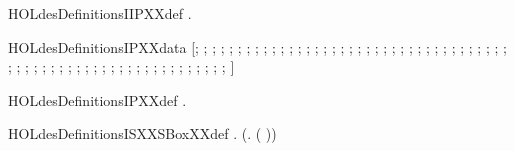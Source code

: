 \newcommand{\HOLdesDefinitionsIIPXXdata}{\UseVerbatim{HOLdesDefinitionsIIPXXdata}}
\begin{SaveVerbatim}{HOLdesDefinitionsIIPXXdef}
\HOLTokenTurnstile{} \HOLSymConst{\HOLTokenForall{}}.   \HOLSymConst{=}   
\end{SaveVerbatim}
\newcommand{\HOLdesDefinitionsIIPXXdef}{\UseVerbatim{HOLdesDefinitionsIIPXXdef}}
\begin{SaveVerbatim}{HOLdesDefinitionsIPXXdata}
\HOLTokenTurnstile{}  \HOLSymConst{=}
   [; ; ; ; ; ; ; ; ; ; ; ; ; ; ;
    ; ; ; ; ; ; ; ; ; ; ; ; ; ; ;
    ; ; ; ; ; ; ; ; ; ; ; ; ; ; ; ;
    ; ; ; ; ; ; ; ; ; ; ; ; ; ; ;
    ; ; ]
\end{SaveVerbatim}
\newcommand{\HOLdesDefinitionsIPXXdata}{\UseVerbatim{HOLdesDefinitionsIPXXdata}}
\begin{SaveVerbatim}{HOLdesDefinitionsIPXXdef}
\HOLTokenTurnstile{} \HOLSymConst{\HOLTokenForall{}}.   \HOLSymConst{=}   
\end{SaveVerbatim}
\newcommand{\HOLdesDefinitionsIPXXdef}{\UseVerbatim{HOLdesDefinitionsIPXXdef}}
\begin{SaveVerbatim}{HOLdesDefinitionsISXXSBoxXXdef}
\HOLTokenTurnstile{} \HOLSymConst{\HOLTokenForall{}}.
       \HOLSymConst{\HOLTokenEquiv{}}
       \HOLSymConst{=}  \HOLSymConst{\HOLTokenConj{}}  (\HOLTokenLambda{}.   (  )) 
\end{SaveVerbatim}
